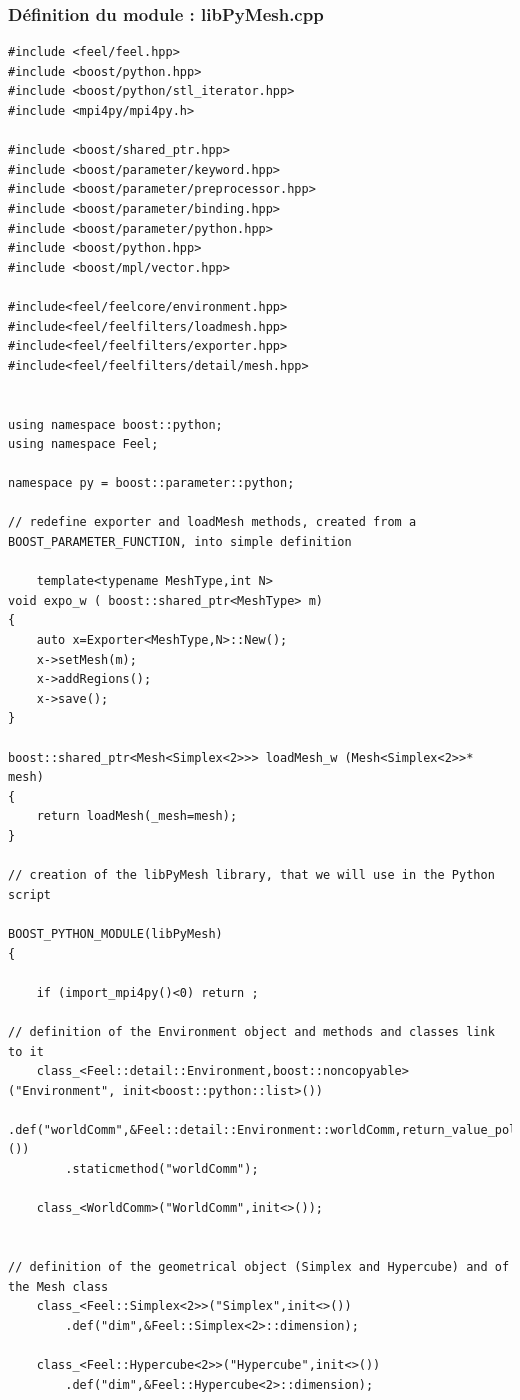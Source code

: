 \documentclass[french,12pt]{article}
\begin{document}
\subsubsection{Définition du module : libPyMesh.cpp}
\begin{lstlisting}
#include <feel/feel.hpp>
#include <boost/python.hpp>
#include <boost/python/stl_iterator.hpp>
#include <mpi4py/mpi4py.h>

#include <boost/shared_ptr.hpp>
#include <boost/parameter/keyword.hpp>
#include <boost/parameter/preprocessor.hpp>
#include <boost/parameter/binding.hpp>
#include <boost/parameter/python.hpp>
#include <boost/python.hpp>
#include <boost/mpl/vector.hpp>

#include<feel/feelcore/environment.hpp>
#include<feel/feelfilters/loadmesh.hpp>
#include<feel/feelfilters/exporter.hpp>
#include<feel/feelfilters/detail/mesh.hpp>


using namespace boost::python;
using namespace Feel;

namespace py = boost::parameter::python;

// redefine exporter and loadMesh methods, created from a BOOST_PARAMETER_FUNCTION, into simple definition
 
    template<typename MeshType,int N>
void expo_w ( boost::shared_ptr<MeshType> m)
{
    auto x=Exporter<MeshType,N>::New();
    x->setMesh(m);
    x->addRegions();
    x->save();
}

boost::shared_ptr<Mesh<Simplex<2>>> loadMesh_w (Mesh<Simplex<2>>* mesh)
{
    return loadMesh(_mesh=mesh);
}

// creation of the libPyMesh library, that we will use in the Python script 

BOOST_PYTHON_MODULE(libPyMesh)
{

    if (import_mpi4py()<0) return ;

// definition of the Environment object and methods and classes link to it 
    class_<Feel::detail::Environment,boost::noncopyable>("Environment", init<boost::python::list>()) 
        .def("worldComm",&Feel::detail::Environment::worldComm,return_value_policy<copy_non_const_reference>())
        .staticmethod("worldComm");

    class_<WorldComm>("WorldComm",init<>());


// definition of the geometrical object (Simplex and Hypercube) and of the Mesh class 
    class_<Feel::Simplex<2>>("Simplex",init<>())
        .def("dim",&Feel::Simplex<2>::dimension);

    class_<Feel::Hypercube<2>>("Hypercube",init<>())
        .def("dim",&Feel::Hypercube<2>::dimension);




\end{lstlisting}
\end{document}
